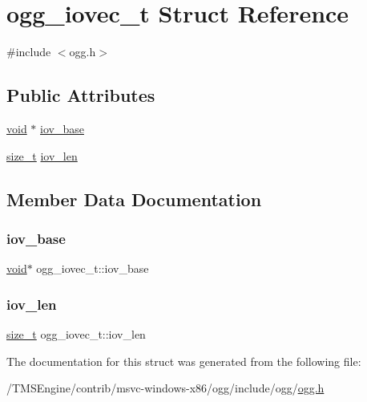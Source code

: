 \hypertarget{structogg__iovec__t}{}\section{ogg\+\_\+iovec\+\_\+t Struct Reference}
\label{structogg__iovec__t}


{\ttfamily \#include $<$ogg.\+h$>$}

\subsection*{Public Attributes}
\begin{DoxyCompactItemize}
\item 
\hyperlink{_s_d_l__opengles2__gl2ext_8h_ae5d8fa23ad07c48bb609509eae494c95}{void} $\ast$ \hyperlink{structogg__iovec__t_a07c65ea68e539cc10ed1670c0de8aea0}{iov\+\_\+base}
\item 
\hyperlink{_s_d_l__config_8h_a7c94ea6f8948649f8d181ae55911eeaf}{size\+\_\+t} \hyperlink{structogg__iovec__t_a52b887e0511104920cdc181c9e4136ce}{iov\+\_\+len}
\end{DoxyCompactItemize}


\subsection{Member Data Documentation}
\mbox{\label{structogg__iovec__t_a07c65ea68e539cc10ed1670c0de8aea0}} 
\subsubsection{\texorpdfstring{iov\+\_\+base}{iov\_base}}
{\footnotesize\ttfamily \hyperlink{_s_d_l__opengles2__gl2ext_8h_ae5d8fa23ad07c48bb609509eae494c95}{void}$\ast$ ogg\+\_\+iovec\+\_\+t\+::iov\+\_\+base}

\mbox{\label{structogg__iovec__t_a52b887e0511104920cdc181c9e4136ce}} 
\subsubsection{\texorpdfstring{iov\+\_\+len}{iov\_len}}
{\footnotesize\ttfamily \hyperlink{_s_d_l__config_8h_a7c94ea6f8948649f8d181ae55911eeaf}{size\+\_\+t} ogg\+\_\+iovec\+\_\+t\+::iov\+\_\+len}



The documentation for this struct was generated from the following file\+:\begin{DoxyCompactItemize}
\item 
/\+T\+M\+S\+Engine/contrib/msvc-\/windows-\/x86/ogg/include/ogg/\hyperlink{ogg_8h}{ogg.\+h}\end{DoxyCompactItemize}

